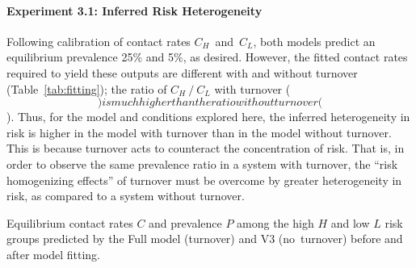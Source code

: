 \paragraph{Experiment 3.1: Inferred Risk Heterogeneity}
Following calibration of contact rates $C_H$~and~$C_L$,
both models predict an equilibrium prevalence 25\% and 5\%, as desired.
However, the fitted contact rates required to yield these outputs
are different with and without turnover (Table~\ref{tab:fitting});
the ratio of $C_H~/~C_L$ with turnover
($$)
is much higher than the ratio without turnover
($$).
Thus, for the model and conditions explored here,
the inferred heterogeneity in risk
is higher in the model with turnover than in the model without turnover.
This is because turnover acts to counteract the concentration of risk.
That is, in order to observe the same prevalence ratio in a system with turnover,
the ``risk homogenizing effects'' of turnover must be overcome by
greater heterogeneity in risk, as compared to a system without turnover.
\begin{table}
  \centering
  \caption{Equilibrium contact rates $C$ and prevalence $P$
    among the high $H$ and low $L$ risk groups
    predicted by the Full model (turnover) and V3 (no~turnover)
    before and after model fitting.}
  \label{tab:fitting}
  
\end{table}
